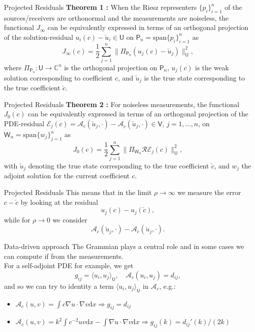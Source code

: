 \documentclass{beamer}
\newcommand{\sU}{\mathsf{U}}
\newcommand{\mA}{\mathcal{A}}
\begin{document}
\begin{frame}{Projected Residuals}
\textbf{Theorem 1 \cite{van2025analysis}: }
When the Riesz representers $\{p_i\}_{i=1}^n$ of the sources/receivers are orthonormal and the measurements are noiseless, the functional $J_\infty$ can be equivalently expressed in terms of an orthogonal projection of the solution-residual $u_i(c) - \check{u}_i \in \mathsf{U}$ on $\mathsf{P}_n = \text{span}\{p_i\}_{i=1}^n$ as
\[
J_{\infty}(c) = {\textstyle\frac{1}{2}}\sum_{j=1}^n\|\Pi_{\mathsf{P}_n}(u_j(c) - \check{u}_j)\|_{\mathsf{U}}^2,
\]
where $\Pi_{\mathsf{P}_n}:\sU\rightarrow\mathbb{C}^n$ is the orthogonal projection on $\mathsf{P}_n$, $u_j(c)$ is the weak solution corresponding to coefficient $c$, and $\check{u}_j$ is the true state corresponding to the true coefficient $\check{c}$.

\end{frame}

\begin{frame}{Projected Residuals}
\textbf{Theorem 2 \cite{van2025analysis}: }
For noiseless measurements, the functional $J_0(c)$ can be equivalently expressed in terms of an orthogonal projection of the PDE-residual $\mathcal{E}_j(c) = \mathcal{A}_c(\check{u}_j,\cdot) -  \mathcal{A}_{\check{c}}(\check{u}_j,\cdot) \in \mathsf{V}$, $j=1,\ldots,n$, on $\mathsf{W}_n = \text{span}\{w_j\}_{j=1}^n$ as
\[
J_0(c) = {\textstyle\frac{1}{2}}\sum_{j=1}^n \|\Pi_{\mathsf{W}_n}\mathcal{R}\mathcal{E}_j(c)\|_{\mathsf{U}}^2,
\]
with $\check{u}_j$ denoting the true state corresponding to the true coefficient $\check{c}$, and $w_j$ the adjoint solution for the current coefficient $c$.
\end{frame}


\begin{frame}{Projected Residuals}
This means that in the limit $\rho\rightarrow\infty$ we measure the error $c-\check{c}$ by looking at the residual
\[
u_j(c) - u_j(\check{c}),
\]
while for $\rho\rightarrow 0$ we consider
\[
\mathcal{A}_c(\check{u}_j,\cdot) -  \mathcal{A}_{\check{c}}(\check{u}_j,\cdot). 
\]
\end{frame}

\begin{frame}{Data-driven approach}
The Grammian plays a central role and in some cases we can compute if from the measurements.
\\[1cm]
For a self-adjoint PDE for example, we get
$$g_{ij} = \langle u_i, u_j \rangle_\sU, \quad \mA_c(u_i,u_j) = d_{ij},$$
and so we can try to identity a term $\langle u_i, u_j\rangle_\sU$ in $\mathcal{A}_c$, e.g.:
\begin{itemize}
  \item $\mA_c(u,v) = \int c \nabla u\cdot \nabla v \mathrm{d}x \Rightarrow g_{ij}=d_{ij}$
  \item $\mA_c(u,v) = k^2 \int c^{-2} u v \mathrm{d}x - \int \nabla u\cdot \nabla v \mathrm{d}x \Rightarrow g_{ij}(k) = d_{ij}'(k) / (2k)$
\end{itemize}
\end{frame}
\end{document}
